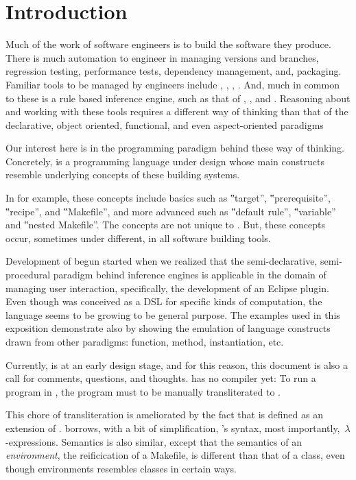 \section{Introduction}

Much of the work of software engineers is to build the software they produce.
There is much automation to engineer in managing versions and branches,
regression testing, performance tests, dependency management, and, packaging.
Familiar tools to be managed by engineers include %
, , 
, . And, much in common to these is a
rule based inference engine, such as that of , , and
. Reasoning about and working with these tools requires a different
way of thinking than that of the declarative, object oriented, functional, and
even aspect-oriented paradigms

Our interest here is in the programming paradigm behind these way of thinking.
Concretely, \Reap is a programming language under design whose main constructs
resemble underlying concepts of these building systems.

In  for example, these concepts include basics such as ‟target”,
‟prerequisite”, ‟recipe”, and ‟Makefile”, and more advanced such as ‟default
rule”, ‟variable” and ‟nested Makefile”. The concepts are not unique to
. But, these concepts occur, sometimes under different, in all
software building tools.

Development of \Reap begun started when we realized that the semi-declarative,
semi-procedural paradigm behind inference engines is applicable in the domain
of managing user interaction, specifically, the development of an Eclipse
plugin. Even though \Reap was conceived as a DSL for specific kinds of
computation, the language seems to be growing to be general purpose.
The examples used in this exposition demonstrate \Reap also by showing the
emulation of language constructs drawn from other paradigms: function, method,
instantiation, etc.

Currently, \Reap is at an early design stage, and for this reason, this
document is also a call for comments, questions, and thoughts. \Reap has no
compiler yet: To run a program in \Reap, the program must to be manually
transliterated to \Java.

This chore of transliteration is ameliorated by the fact that \Reap is defined
as an extension of \Java. \Reap borrows, with a bit of simplification, \Java's
syntax, most importantly,~$λ$-expressions. Semantics is also similar, except
that the semantics of an \emph{environment}, the \Reap reificication of a
Makefile, is different than that of a \Java class, even though environments
resembles classes in certain ways.

